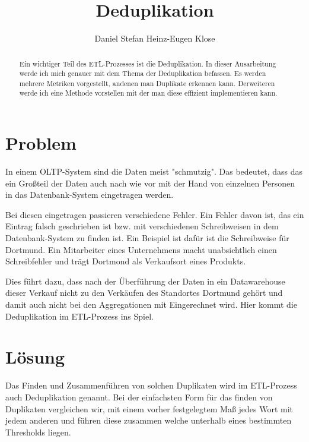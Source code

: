 \documentclass[sigconf]{acmart}
\begin{document}
\title{Deduplikation}

\author{Daniel Stefan Heinz-Eugen Klose}


\begin{abstract}
Ein wichtiger Teil des ETL-Prozesses ist die Deduplikation.
In dieser Ausarbeitung werde ich mich genauer mit dem Thema der Deduplikation
befassen. Es werden mehrere Metriken vorgestellt, andenen man Duplikate erkennen kann.
Derweiteren werde ich eine Methode vorstellen mit der man diese effizient implementieren kann.


\end{abstract}

\maketitle

\section*{Problem}
In einem OLTP-System sind die Daten meist "schmutzig". Das bedeutet, dass 
das ein Großteil der Daten auch nach wie vor mit der Hand von einzelnen
Personen in das Datenbank-System eingetragen werden. 

Bei diesen eingetragen
passieren verschiedene Fehler. Ein Fehler davon ist, das ein Eintrag falsch
geschrieben ist bzw. mit verschiedenen Schreibweisen in dem Datenbank-System
zu finden ist. Ein Beispiel ist dafür ist die Schreibweise für Dortmund.
Ein Mitarbeiter eines Unternehmens macht unabsichtlich einen 
Schreibfehler und trägt Dortmond als Verkaufsort eines Produkts.

Dies führt dazu, dass nach der Überführung der Daten in ein 
Datawarehouse dieser Verkauf nicht zu den Verkäufen des Standortes Dortmund
gehört und damit auch nicht bei den Aggregationen mit Eingerechnet wird.
Hier kommt die Deduplikation im ETL-Prozess ins Spiel.

\section*{Lösung}
Das Finden und Zusammenführen von solchen Duplikaten wird im ETL-Prozess 
auch Deduplikation genannt. Bei der einfachsten Form für das finden von
Duplikaten vergleichen wir, mit einem vorher festgelegtem Maß jedes Wort 
mit jedem anderen und führen diese zusammen welche unterhalb eines 
bestimmten Thresholds liegen.
\end{document}
